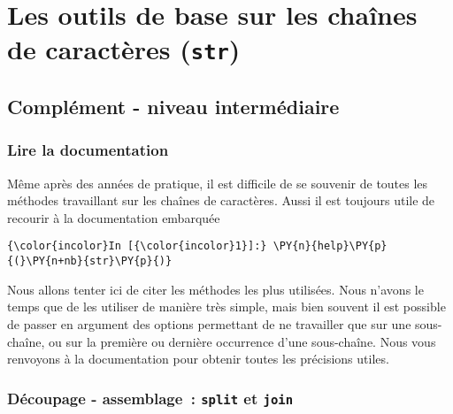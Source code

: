     \hypertarget{les-outils-de-base-sur-les-chauxeenes-de-caractuxe8res-str}{%
\section{\texorpdfstring{Les outils de base sur les chaînes de
caractères
(\texttt{str})}{Les outils de base sur les chaînes de caractères (str)}}\label{les-outils-de-base-sur-les-chauxeenes-de-caractuxe8res-str}}

    \hypertarget{compluxe9ment---niveau-intermuxe9diaire}{%
\subsection{Complément - niveau
intermédiaire}\label{compluxe9ment---niveau-intermuxe9diaire}}

    \hypertarget{lire-la-documentation}{%
\subsubsection{Lire la documentation}\label{lire-la-documentation}}

    Même après des années de pratique, il est difficile de se souvenir de
toutes les méthodes travaillant sur les chaînes de caractères. Aussi il
est toujours utile de recourir à la documentation embarquée

    \begin{Verbatim}[commandchars=\\\{\}]
{\color{incolor}In [{\color{incolor}1}]:} \PY{n}{help}\PY{p}{(}\PY{n+nb}{str}\PY{p}{)}
\end{Verbatim}



    Nous allons tenter ici de citer les méthodes les plus utilisées. Nous
n'avons le temps que de les utiliser de manière très simple, mais bien
souvent il est possible de passer en argument des options permettant de
ne travailler que sur une sous-chaîne, ou sur la première ou dernière
occurrence d'une sous-chaîne. Nous vous renvoyons à la documentation
pour obtenir toutes les précisions utiles.

    \hypertarget{duxe9coupage---assemblage-split-et-join}{%
\subsubsection{\texorpdfstring{Découpage - assemblage~: \texttt{split}
et
\texttt{join}}{Découpage - assemblage~: split et join}}\label{duxe9coupage---assemblage-split-et-join}}

